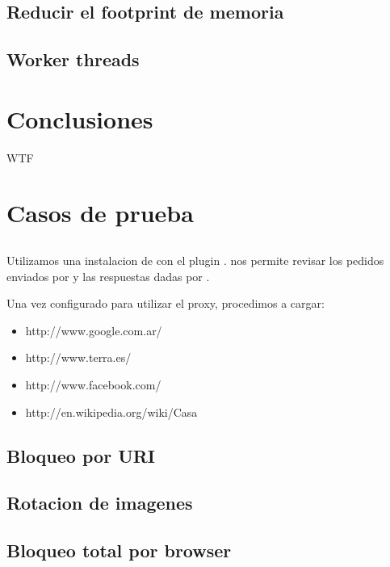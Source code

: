 \documentclass[11pt,a4paper,titlepage]{article}
\begin{document}
    \subsection{Reducir el footprint de memoria}

    \subsection{Worker threads}

\section{Conclusiones}
    WTF

\section{Casos de prueba}
    \subsection{}
    Utilizamos una instalacion de  con el plugin .
     nos permite revisar los pedidos enviados por  y las respuestas dadas por \duta.

    Una vez configurado  para utilizar el proxy, procedimos a cargar:
    \begin{itemize}
        \item http://www.google.com.ar/
        \item http://www.terra.es/
        \item http://www.facebook.com/
        \item http://en.wikipedia.org/wiki/Casa
    \end{itemize}

    \subsection{Bloqueo por URI}

    \subsection{Rotacion de imagenes}

    \subsection{Bloqueo total por browser}
\end{document}

